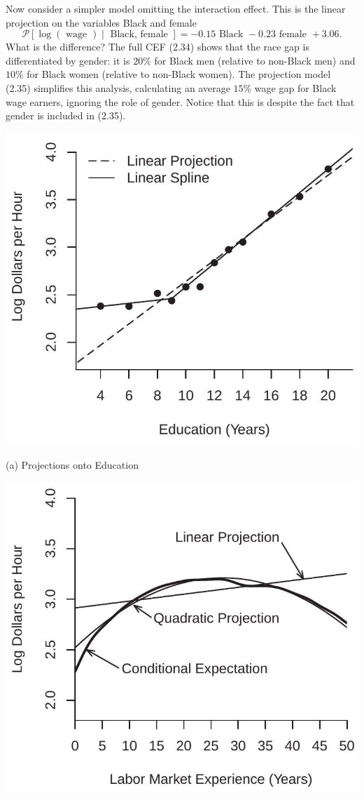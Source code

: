 \documentclass[10pt]{article}
\begin{document}
Now consider a simpler model omitting the interaction effect. This is the linear projection on the variables Black and female
$$
\mathscr{P}[\log (\text { wage }) \mid \text { Black, female }]=-0.15 \text { Black }-0.23 \text { female }+3.06 .
$$
What is the difference? The full CEF (2.34) shows that the race gap is differentiated by gender: it is $20 \%$ for Black men (relative to non-Black men) and $10 \%$ for Black women (relative to non-Black women). The projection model (2.35) simplifies this analysis, calculating an average $15 \%$ wage gap for Black wage earners, ignoring the role of gender. Notice that this is despite the fact that gender is included in (2.35).

\includegraphics[max width=\textwidth]{2022_09_17_efa0deee3441d06e0b66g-28}

(a) Projections onto Education

\includegraphics[max width=\textwidth]{2022_09_17_efa0deee3441d06e0b66g-28(1)}
\end{document}
